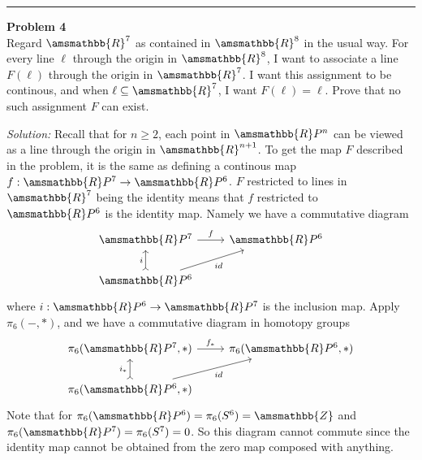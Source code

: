 \documentclass[a4paper, 12pt]{article}
\newenvironment{problem}[2][Problem]
    { \begin{mdframed}[backgroundcolor=gray!20] \textbf{#1 #2} \\}
    {  \end{mdframed}}
\newenvironment{solution}
    {\textit{Solution:}}
    {}
\renewcommand{\mathbb}{\amsmathbb}
\begin{document}
\noindent\rule{7in}{2.8pt}
\begin{problem}{4}
Regard \(\mathbb{R}^7\) as contained in \(\mathbb{R}^8\) in the usual way. For every line \(\ell\) through the origin in \(\mathbb{R}^8\), I want to associate a line \(F(\ell)\) through the origin in \(\mathbb{R}^7\). 
I want this assignment to be continous, and when \(\ell\subseteq \mathbb{R}^7\), I want \(F(\ell)=\ell\). Prove that no such assignment \(F\) can exist.
\end{problem}
\begin{solution}
Recall that for \(n\geq 2\), each point in \(\mathbb{R}P^n\) can be viewed as a line through the origin in \(\mathbb{R}^{n+1}\). To get the map \(F\) described in the problem, it is the same as defining a continous map \(f:\mathbb{R}P^7\rightarrow \mathbb{R}P^6\). \(F\) restricted to 
lines in \(\mathbb{R}^7\) being the identity means that \(f\) restricted to \(\mathbb{R}P^6\) is the identity map. Namely we have a commutative diagram 
\[\begin{tikzcd}
	{\mathbb{R}P^7} & {\mathbb{R}P^6} \\
	{\mathbb{R}P^6}
	\arrow["f", from=1-1, to=1-2]
	\arrow["i", tail, from=2-1, to=1-1]
	\arrow["id"', from=2-1, to=1-2]
\end{tikzcd}\]
where \(i:\mathbb{R}P^6\rightarrow \mathbb{R}P^7\) is the inclusion map. Apply \(\pi_6(-,*)\), and we have a commutative diagram in homotopy groups 
\[\begin{tikzcd}
	{\pi_6(\mathbb{R}P^7,*)} & {\pi_6(\mathbb{R}P^6,*)} \\
	{\pi_6(\mathbb{R}P^6,*)}
	\arrow["{f_*}", from=1-1, to=1-2]
	\arrow["{i_*}", tail, from=2-1, to=1-1]
	\arrow["id"', from=2-1, to=1-2]
\end{tikzcd}\]
Note that for \(\pi_6(\mathbb{R}P^6)=\pi_6(S^6)=\mathbb{Z}\) and \(\pi_6(\mathbb{R}P^7)=\pi_6(S^7)=0\). So this diagram cannot commute since the identity map cannot be obtained from the zero map 
composed with anything.
\end{solution}
\end{document}
